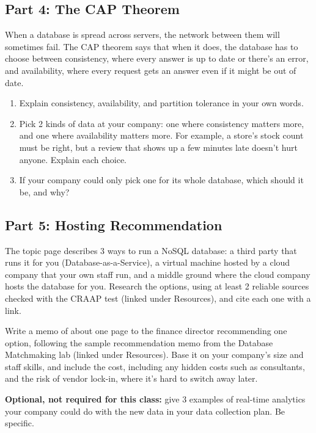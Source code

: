 \documentclass[12pt]{article}
\begin{document}
\subsection*{Part 4: The CAP Theorem}
When a database is spread across servers, the network between them will sometimes fail. The CAP theorem says that when it does, the database has to choose between consistency, where every answer is up to date or there's an error, and availability, where every request gets an answer even if it might be out of date.
\begin{enumerate}
    \item Explain consistency, availability, and partition tolerance in your own words.
    \item Pick 2 kinds of data at your company: one where consistency matters more, and one where availability matters more. For example, a store's stock count must be right, but a review that shows up a few minutes late doesn't hurt anyone. Explain each choice.
    \item If your company could only pick one for its whole database, which should it be, and why?
\end{enumerate}

\subsection*{Part 5: Hosting Recommendation}
The topic page describes 3 ways to run a NoSQL database: a third party that runs it for you (Database-as-a-Service), a virtual machine hosted by a cloud company that your own staff run, and a middle ground where the cloud company hosts the database for you. Research the options, using at least 2 reliable sources checked with the CRAAP test (linked under Resources), and cite each one with a link.

Write a memo of about one page to the finance director recommending one option, following the sample recommendation memo from the Database Matchmaking lab (linked under Resources). Base it on your company's size and staff skills, and include the cost, including any hidden costs such as consultants, and the risk of vendor lock-in, where it's hard to switch away later.

\textbf{Optional, not required for this class:} give 3 examples of real-time analytics your company could do with the new data in your data collection plan. Be specific.
\end{document}
